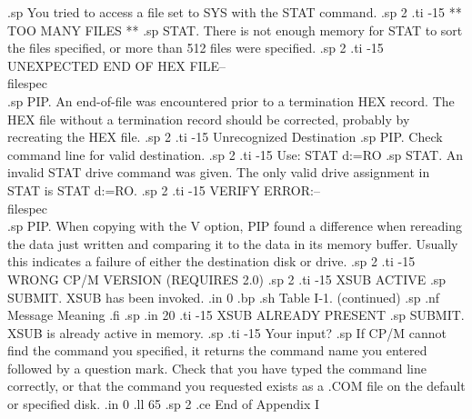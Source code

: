 .sp
You tried to access a file set to SYS with the STAT command.
.sp 2
.ti -15
** TOO MANY FILES **
.sp
STAT.  There is not enough memory for STAT to sort the files 
specified, or more than 512 files were specified.
.sp 2
.ti -15
UNEXPECTED END OF HEX FILE--\\{filespec\\}
.sp
PIP.  An end-of-file was encountered prior to a termination HEX 
record.  The HEX file without a termination record should be 
corrected, probably by recreating the HEX file.
.sp 2
.ti -15
Unrecognized Destination
.sp
PIP.  Check command line for valid destination.
.sp 2
.ti -15
Use: STAT d:=RO
.sp
STAT.  An invalid STAT drive command was given.  The only valid 
drive assignment in STAT is STAT d:=RO.
.sp 2
.ti -15
VERIFY ERROR:--\\{filespec\\}
.sp
PIP.  When copying with the V option, PIP found a difference when 
rereading the data just written and comparing it to the data in 
its memory buffer.  Usually this indicates a failure of either 
the destination disk or drive.
.sp 2
.ti -15
WRONG CP/M VERSION (REQUIRES 2.0)
.sp 2
.ti -15
XSUB ACTIVE
.sp
SUBMIT.  XSUB has been invoked.
.in 0
.bp
.sh
                     Table I-1.  (continued)
.sp
.nf
     Message        Meaning
.fi
.sp
.in 20
.ti -15
XSUB ALREADY PRESENT
.sp
SUBMIT.  XSUB is already active in memory.
.sp
.ti -15
Your input?
.sp
If CP/M cannot find the command you specified, it returns the 
command name you entered followed by a question mark.  Check that 
you have typed the command line correctly, or that the command 
you requested exists as a .COM file on the default or specified 
disk.
.in 0
.ll 65
.sp 2
.ce
End of Appendix I
